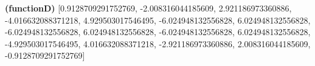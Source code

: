 \documentclass[11pt]{article}
\renewcommand\part[1]{\vspace{.10in}\textbf{(#1)}}
\begin{document}
     \part{functionD} [0.9128709291752769, -2.008316044185609, 2.921186973360886, -4.016632088371218, 4.929503017546495, -6.024948132556828, 6.024948132556828, -6.024948132556828, 6.024948132556828, -6.024948132556828, 6.024948132556828, -4.929503017546495, 4.016632088371218, -2.921186973360886, 2.008316044185609, -0.9128709291752769]\\
     
	
\end{document}
